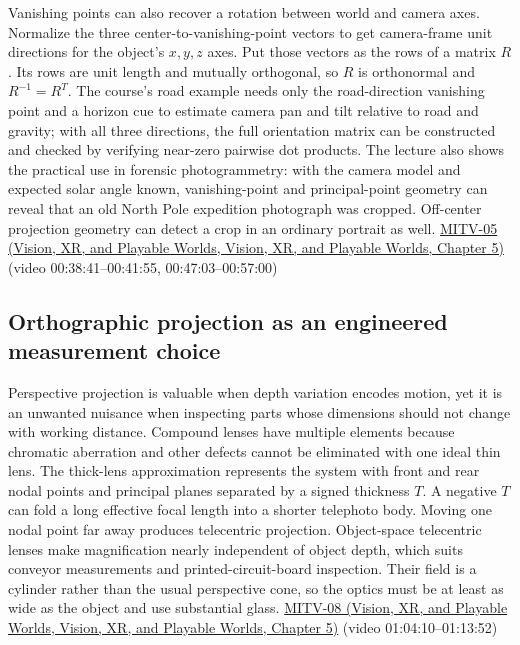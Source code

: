 Vanishing points can also recover a rotation between world and camera axes. Normalize the three center-to-vanishing-point vectors to get camera-frame unit directions for the object's \(x,y,z\) axes. Put those vectors as the rows of a matrix \(R\). Its rows are unit length and mutually orthogonal, so \(R\) is orthonormal and \(R^{-1}=R^T\). The course's road example needs only the road-direction vanishing point and a horizon cue to estimate camera pan and tilt relative to road and gravity; with all three directions, the full orientation matrix can be constructed and checked by verifying near-zero pairwise dot products. The lecture also shows the practical use in forensic photogrammetry: with the camera model and expected solar angle known, vanishing-point and principal-point geometry can reveal that an old North Pole expedition photograph was cropped. Off-center projection geometry can detect a crop in an ordinary portrait as well. \href{../07-Vision-XR-and-Playable-Worlds/main.pdf\#nameddest=04-visual-computing-ii-ch036-mitv-05---tcc-and-for-montivision-demos-vanishing-point-use-of-vps-in-camera-calibration}{MITV-05 (Vision, XR, and Playable Worlds, Vision, XR, and Playable Worlds, Chapter 5)} (video 00:38:41--00:41:55, 00:47:03--00:57:00)

\subsection{Orthographic projection as an engineered measurement choice}\label{03-visual-computing-i-ch003-orthographic-projection-as-an-engineered-measurement-choice}

Perspective projection is valuable when depth variation encodes motion, yet it is an unwanted nuisance when inspecting parts whose dimensions should not change with working distance. Compound lenses have multiple elements because chromatic aberration and other defects cannot be eliminated with one ideal thin lens. The thick-lens approximation represents the system with front and rear nodal points and principal planes separated by a signed thickness \(T\). A negative \(T\) can fold a long effective focal length into a shorter telephoto body. Moving one nodal point far away produces telecentric projection. Object-space telecentric lenses make magnification nearly independent of object depth, which suits conveyor measurements and printed-circuit-board inspection. Their field is a cylinder rather than the usual perspective cone, so the optics must be at least as wide as the object and use substantial glass. \href{../07-Vision-XR-and-Playable-Worlds/main.pdf\#nameddest=04-visual-computing-ii-ch036-mitv-08---shading-special-cases-lunar-surface-scanning-electron-microscope-greens-theorem}{MITV-08 (Vision, XR, and Playable Worlds, Vision, XR, and Playable Worlds, Chapter 5)} (video 01:04:10--01:13:52)

